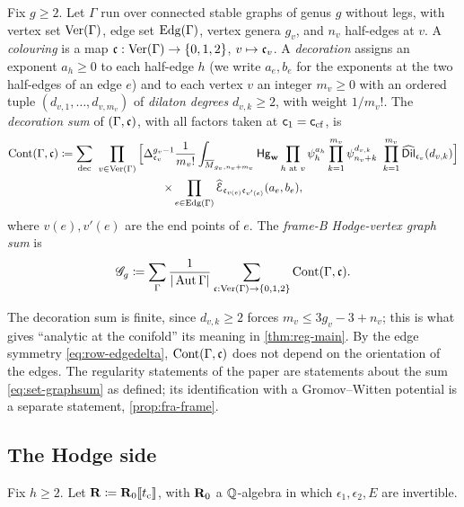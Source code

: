 \begin{defn}
\label{def:set-graphsum}
Fix $g\geq2$. Let $\Gamma$ run over connected stable graphs of genus $g$ without legs, with vertex set $\mathrm{Ver}(\Gamma)$, edge set $\mathrm{Edg}(\Gamma)$, vertex genera $g_v$, and $n_v$ half-edges at $v$. A \emph{colouring} is a map $\mathfrak{c}:\mathrm{Ver}(\Gamma)\to\{0,1,2\}$, $v\mapsto\mathfrak{c}_v$. A \emph{decoration} assigns an exponent $a_h\geq0$ to each half-edge $h$ (we write $a_e,b_e$ for the exponents at the two half-edges of an edge $e$) and to each vertex $v$ an integer $m_v\geq0$ with an ordered tuple $(d_{v,1},\ldots,d_{v,m_v})$ of \emph{dilaton degrees} $d_{v,k}\geq2$, with weight $1/m_v!$. The \emph{decoration sum} of $(\Gamma,\mathfrak{c})$, with all factors taken at $\mathsf{c}_{1}=\mathsf{c}_{\mathrm{cf}}$, is
\begin{multline}
\label{eq:set-graphsum}
\GCont(\Gamma,\col)\coloneqq\sum_{\mathrm{dec}}\ \prod_{v\in\Ver(\Gamma)}\Big[\Delta_{\col_v}^{g_v-1}\frac{1}{m_v!}\int_{\Mbar_{g_v,n_v+m_v}}\Hg_{\bw}\prod_{h\text{ at }v}\psi_h^{a_h}\prod_{k=1}^{m_v}\psi_{n_v+k}^{d_{v,k}}\ \prod_{k=1}^{m_v}\Dilh_{\col_v}(d_{v,k})\Big]\\
\times\prod_{e\in\Edg(\Gamma)}\Edgeh_{\col_{v(e)}\col_{v'(e)}}(a_e,b_e),
\end{multline}
where $v(e),v'(e)$ are the end points of $e$. The \emph{frame-B Hodge-vertex graph sum} is
\begin{equation}
\label{eq:set-Gsum}
\mathscr{G}_g\coloneqq\sum_{\Gamma}\frac{1}{|\operatorname{Aut}\Gamma|}\sum_{\mathfrak{c}:\mathrm{Ver}(\Gamma)\to\{0,1,2\}}\mathrm{Cont}(\Gamma,\mathfrak{c}).
\end{equation}
\end{defn}

The decoration sum is finite, since $d_{v,k}\geq2$ forces $m_v\leq3g_v-3+n_v$; this is what gives ``analytic at the conifold'' its meaning in \cref{thm:reg-main}. By the edge symmetry \eqref{eq:row-edgedelta}, $\mathrm{Cont}(\Gamma,\mathfrak{c})$ does not depend on the orientation of the edges. The regularity statements of the paper are statements about the sum \eqref{eq:set-graphsum} as defined; its identification with a Gromov--Witten potential is a separate statement, \cref{prop:fra-frame}.

\subsection{The Hodge side}
\label{sec:set-hodge}

Fix $h\geq2$. Let $\mathbf{R}\coloneqq\mathbf{R}_0[\![ t_{\mathrm{c}} ]\!]$, with $\mathbf{R}_0$ a $\mathbb{Q}$-algebra in which $\epsilon_1,\epsilon_2,E$ are invertible.

